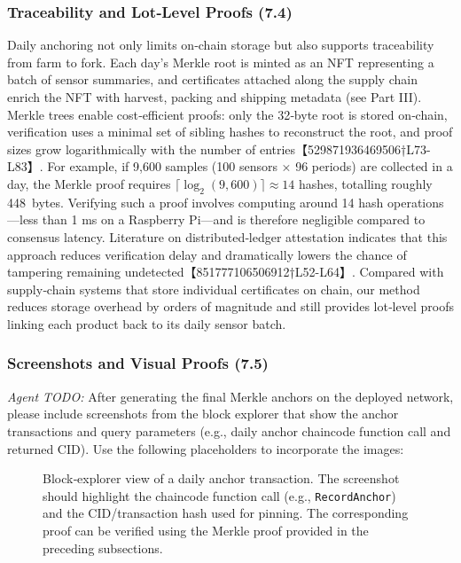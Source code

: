 \documentclass[12pt,onecolumn]{IEEEtran} %
\begin{document}
\subsubsection{Traceability and Lot‑Level Proofs (7.4)}
Daily anchoring not only limits on‑chain storage but also supports
traceability from farm to fork.  Each day’s Merkle root is minted as an
NFT representing a batch of sensor summaries, and certificates attached
along the supply chain enrich the NFT with harvest, packing and shipping
metadata (see Part III).  Merkle trees enable cost‑efficient proofs: only
the 32‑byte root is stored on‑chain, verification uses a minimal set of
sibling hashes to reconstruct the root, and proof sizes grow
logarithmically with the number of entries【529871936469506†L73-L83】.  For
example, if 9{,}600 samples (100 sensors × 96 periods) are collected in a
day, the Merkle proof requires \(\lceil\log_2(9{,}600)\rceil \approx 14\)
hashes, totalling roughly 448~bytes.  Verifying such a proof involves
computing around 14 hash operations—less than 1 ms on a Raspberry Pi—and is
therefore negligible compared to consensus latency.  Literature on
distributed‑ledger attestation indicates that this approach reduces
verification delay and dramatically lowers the chance of tampering
remaining undetected【851777106506912†L52-L64】.  Compared with supply‑chain
systems that store individual certificates on chain, our method reduces
storage overhead by orders of magnitude and still provides lot‑level
proofs linking each product back to its daily sensor batch.

\subsubsection{Screenshots and Visual Proofs (7.5)}
\textit{Agent TODO:} After generating the final Merkle anchors on the deployed
network, please include screenshots from the block explorer that show the
anchor transactions and query parameters (e.g., daily anchor chaincode
function call and returned CID).  Use the following placeholders to
incorporate the images:
\begin{figure}[!t]
  \centering
  \caption{Block‑explorer view of a daily anchor transaction.  The screenshot
    should highlight the chaincode function call (e.g., \texttt{RecordAnchor})
    and the CID/transaction hash used for pinning.  The corresponding proof
    can be verified using the Merkle proof provided in the preceding
    subsections.}
  \label{fig:block-explorer-anchor}
\end{figure}
\end{document}
